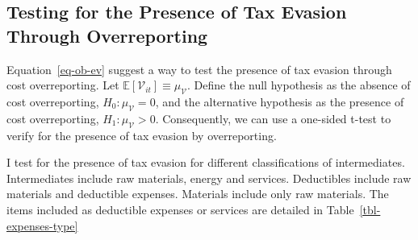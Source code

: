 \documentclass[
  12pt]{article}
\theoremstyle{definition}
\theoremstyle{remark}
\begin{document}
\subsection{Testing for the Presence of Tax Evasion Through
Overreporting}\label{testing-for-the-presence-of-tax-evasion-through-overreporting}

Equation~\ref{eq-ob-ev} suggest a way to test the presence of tax
evasion through cost overreporting. Let
\(\mathbb{E}[\mathcal{V}_{it}]\equiv \mu_{\mathcal{V}}\). Define the
null hypothesis as the absence of cost overreporting,
\(H_0: \mu_{\mathcal{V}}=0\), and the alternative hypothesis as the
presence of cost overreporting, \(H_1: \mu_{\mathcal{V}}>0\).
Consequently, we can use a one-sided t-test to verify for the presence
of tax evasion by overreporting.

I test for the presence of tax evasion for different classifications of
intermediates. Intermediates include raw materials, energy and services.
Deductibles include raw materials and deductible expenses. Materials
include only raw materials. The items included as deductible expenses or
services are detailed in Table~\ref{tbl-expenses-type}
\end{document}
